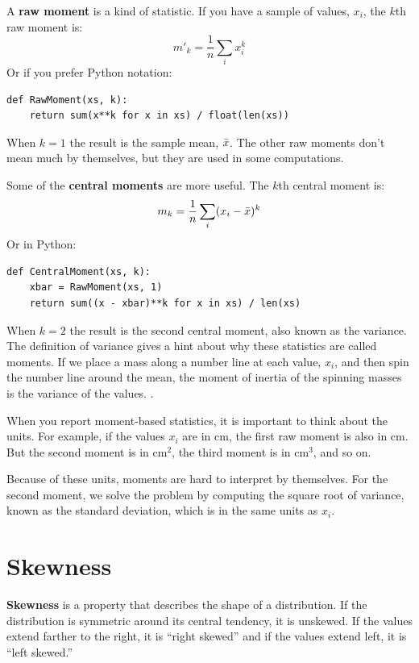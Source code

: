 \documentclass[12pt]{book}
\begin{document}
A {\bf raw moment} is a kind of statistic.  If you have a sample of
values, $x_i$, the $k$th raw moment is:
%
\[ m'_k = \frac{1}{n} \sum_i x_i^k \]
%
Or if you prefer Python notation:

\begin{verbatim}
def RawMoment(xs, k):
    return sum(x**k for x in xs) / float(len(xs))
\end{verbatim}

When $k=1$ the result is the sample mean, $\bar{x}$.  The other
raw moments don't mean much by themselves, but they are used
in some computations.

Some of the {\bf central moments} are more useful.  The
$k$th central moment is:
%
\[ m_k = \frac{1}{n} \sum_i (x_i - \bar{x})^k \]
%
Or in Python:

\begin{verbatim}
def CentralMoment(xs, k):
    xbar = RawMoment(xs, 1)
    return sum((x - xbar)**k for x in xs) / len(xs)
\end{verbatim}

When $k=2$ the result is the second central moment, also known
as the variance.  The definition of variance gives a hint about
why these statistics are called moments.  If we place a mass
along a number line at each value, $x_i$, and then spin the
number line around the mean, the moment of inertia of the spinning
masses is the variance of the values.
.

When you report moment-based statistics, it is important to think
about the units.  For example, if the values $x_i$ are in cm, the
first raw moment is also in cm.  But the second moment is in
cm$^2$, the third moment is in cm$^3$, and so on.

Because of these units, moments are hard to interpret by themselves.  
For the second moment, we solve the problem by computing the
square root of variance, known
as the standard deviation, which is in the same units as $x_i$.


\section{Skewness}

{\bf Skewness} is a property that describes the shape of a distribution.
If the distribution is symmetric around its central tendency, it is
unskewed.  If the values extend farther to the right, it is ``right
skewed'' and if the values extend left, it is ``left skewed.''
\end{document}
